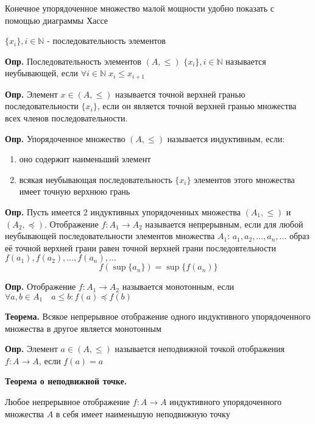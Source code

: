\documentclass[10pt]{article}
\begin{document}
\par Конечное упорядоченное множество малой мощности удобно показать с помощью диаграммы Хассе
\vspace{5mm}
\par $\{ x_{i} \}, i \in \mathbb{N}$ - последовательность элементов
\par\textbf{Опр.} Последовательность элементов $(A, \leq)$ $\{ x_{i} \}, i \in \mathbb{N}$ называется неубывающей, если $\forall i \in \mathbb{N} \; x_{i} \leq x_{i + 1}$
\par\textbf{Опр.}  Элемент $x \in (A, \leq)$ называется точной верхней гранью последовательности $\{ x_{i} \}$, если он является точной верхней гранью множества всех членов последовательности.
\par\textbf{Опр.} Упорядоченное множество $(A, \leq)$ называется индуктивным, если:
\begin{enumerate}
    \item оно содержит наименьший элемент
    \item всякая неубывающая последовательность $\{ x_{i} \}$ элементов этого множества имеет точную верхнюю грань
\end{enumerate}
\vspace{5mm}
\par\textbf{Опр.} Пусть имеется 2 индуктивных упорядоченных множества $(A_{1}, \leq)$ и $(A_{2}, \preceq)$. Отображение $f: A_{1} \to A_{2}$ называется непрерывным, если для любой неубывающей последовательности элементов множества $A_{1}$: $a_{1}, a_{2}, \dots, a_{n}, \dots$ образ её точной верхней грани равен точной верхней грани последовтельности $f(a_{1}), f(a_{2}), \dots, f(a_{n}), \dots$ $$f(\sup \{ a_{n} \}) = \sup \{ f(a_{n}) \}$$
\par\textbf{Опр.} Отображение $f: A_{1} \to A_{2}$ называется монотонным, если $\forall a, b \in A_{1} \quad a \leq b: f(a) \preceq f(b)$
\par\textbf{Теорема.} Всякое непрерывное отображение одного индуктивного упорядоченного множества в другое является монотонным
\par\textbf{Опр.} Элемент $a \in (A, \leq)$ называется неподвижной точкой отображения $f: A \to A$, если $f(a) = a$
\vspace{5mm}
\par\textbf{Теорема о неподвижной точке.}
\par Любое непрерывное отображение $f: A \to A$ индуктивного упорядоченного множества $A$ в себя имеет наименьшую неподвижную точку
\vspace{5mm}
\end{document}
